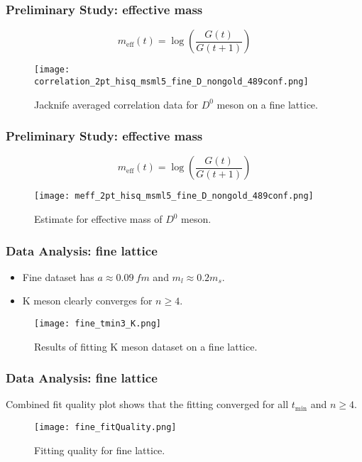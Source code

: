 \documentclass{beamer}
\begin{document}
\begin{frame}
    \frametitle{Preliminary Study: effective mass}
    \begin{equation*}
        m_{\mathrm{eff}}(t) = \log(\frac{G(t)}{G(t+1)})
    \end{equation*}
    \begin{figure}
        \centering
        \texttt{[image: correlation\_2pt\_hisq\_msml5\_fine\_D\_nongold\_489conf.png]}
        \caption{Jacknife averaged correlation data for $D^0$ meson on a fine lattice.}
    \end{figure}
\end{frame}

\begin{frame}
    \frametitle{Preliminary Study: effective mass}
    \begin{equation*}
        m_{\mathrm{eff}}(t) = \log(\frac{G(t)}{G(t+1)})
    \end{equation*}
    \begin{figure}
        \centering
        \texttt{[image: meff\_2pt\_hisq\_msml5\_fine\_D\_nongold\_489conf.png]}
        \caption{Estimate for effective mass of $D^0$ meson.}
    \end{figure}
\end{frame}

\begin{frame}
    \frametitle{Data Analysis: fine lattice}
    \begin{itemize}
        \item Fine dataset has $a \approx \SI{0.09}{fm}$ and $m_l \approx 0.2 m_s$.
        \item K meson clearly converges for $n \geq 4$.
    \end{itemize}
    \begin{figure}
        \centering
        \texttt{[image: fine\_tmin3\_K.png]}
        \caption{Results of fitting K meson dataset on a fine lattice.}
    \end{figure}
\end{frame}

\begin{frame}
    \frametitle{Data Analysis: fine lattice}
    Combined fit quality plot shows that the fitting converged for all $t_\mathrm{min}$ and $n \geq 4$.
    \begin{figure}
        \centering
        \texttt{[image: fine\_fitQuality.png]}
        \caption{Fitting quality for fine lattice.}
    \end{figure}
\end{frame}
\end{document}
